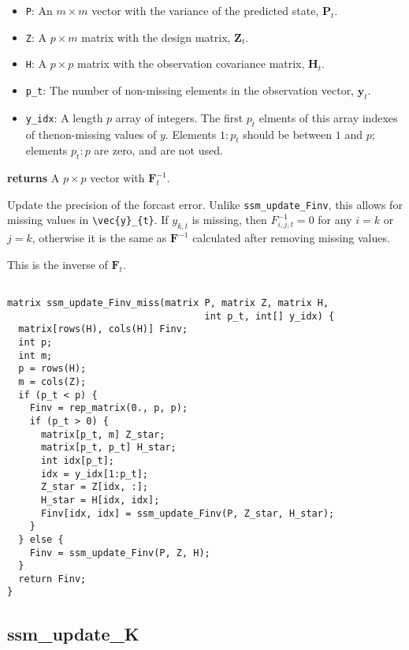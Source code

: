 \documentclass[]{book}
\providecommand{\tightlist}{%
  \setlength{\itemsep}{0pt}\setlength{\parskip}{0pt}}
\newcommand{\mat}[1]{\boldsymbol{#1}}
\renewcommand{\vec}[1]{\boldsymbol{#1}}
\begin{document}
\begin{itemize}
\tightlist
\item
  \texttt{P}: An \(m \times m\) vector with the variance of the
  predicted state, \(\mat{P}_t\).
\item
  \texttt{Z}: A \(p \times m\) matrix with the design matrix,
  \(\mat{Z}_t\).
\item
  \texttt{H}: A \(p \times p\) matrix with the observation covariance
  matrix, \(\mat{H}_t\).
\item
  \texttt{p\_t}: The number of non-missing elements in the observation
  vector, \(\vec{y}_t\).
\item
  \texttt{y\_idx}: A length \(p\) array of integers. The first \(p_t\)
  elments of this array indexes of thenon-missing values of \(y\).
  Elements \(1:p_t\) should be between \(1\) and \(p\); elements
  \(p_t:p\) are zero, and are not used.
\end{itemize}

\textbf{returns} A \(p \times p\) vector with \(\mat{F}^{-1}_t\).

Update the precision of the forcast error. Unlike
\texttt{ssm\_update\_Finv}, this allows for missing values in
\texttt{\textbackslash{}vec\{y\}\_\{t\}}. If \(y_{k,t}\) is missing,
then \(F^{-1}_{i,j,t} = 0\) for any \(i = k\) or \(j = k\), otherwise it
is the same as \(\mat{F}^{-1}\) calculated after removing missing
values.

This is the inverse of \(\mat{F}_t\).

\begin{verbatim}

matrix ssm_update_Finv_miss(matrix P, matrix Z, matrix H,
                                   int p_t, int[] y_idx) {
  matrix[rows(H), cols(H)] Finv;
  int p;
  int m;
  p = rows(H);
  m = cols(Z);
  if (p_t < p) {
    Finv = rep_matrix(0., p, p);
    if (p_t > 0) {
      matrix[p_t, m] Z_star;
      matrix[p_t, p_t] H_star;
      int idx[p_t];
      idx = y_idx[1:p_t];
      Z_star = Z[idx, :];
      H_star = H[idx, idx];
      Finv[idx, idx] = ssm_update_Finv(P, Z_star, H_star);
    }
  } else {
    Finv = ssm_update_Finv(P, Z, H);
  }
  return Finv;
}

\end{verbatim}

\subsection{ssm\_update\_K}\label{ssm_update_k}
\end{document}
